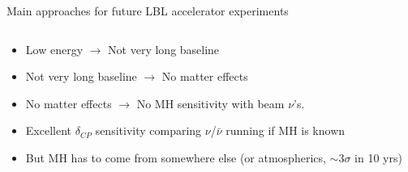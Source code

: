 \begin{frame}{Main approaches for future LBL accelerator experiments}
\begin{columns}[T]
\begin{column}{0.52\textwidth}
{\begin{itemize}
         \item Low energy $\rightarrow$ Not very long baseline
         \item Not very long baseline  $\rightarrow$ No matter effects
         \item No matter effects  $\rightarrow$ No MH sensitivity with beam $\nu$'s.
         \item Excellent $\delta_{CP}$ sensitivity comparing $\nu$/$\bar{\nu}$ running if MH is known
         \item But MH has to come from somewhere else (or atmospherics, $\sim$3$\sigma$ in 10 yrs)
        \end{itemize}
      }
  \end{column}
\end{columns}
\end{frame}


